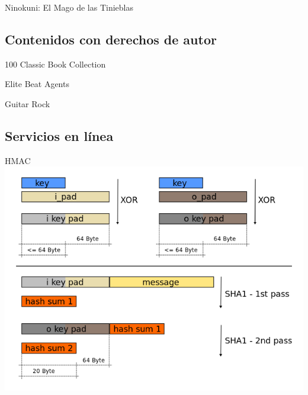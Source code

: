 \begin{frame}{Ninokuni: El Mago de las Tinieblas}

\end{frame}

\subsection{Contenidos con derechos de autor}
\begin{frame}{100 Classic Book Collection}

\end{frame}

\begin{frame}{Elite Beat Agents}

\end{frame}

\begin{frame}{Guitar Rock}

\end{frame}


\subsection{Servicios en línea}
\begin{frame}{HMAC}
    \includegraphics[width=\textwidth,height=0.8\textheight,keepaspectratio]{imgs/hmac.png}
\end{frame}

